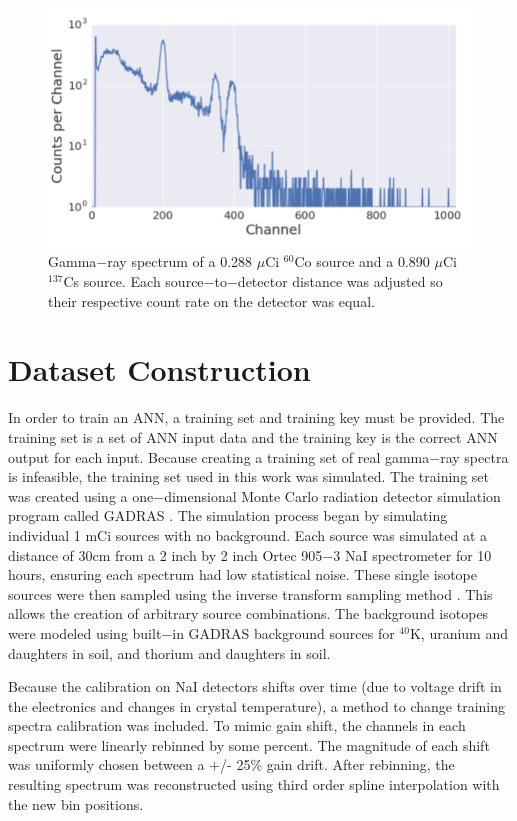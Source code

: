 \documentclass[tocnosub,noragright,centerchapter,12pt,fullpage]{uiucecethesis09}
\begin{document}
\begin{figure}[H]
    \centering
    \includegraphics[width=0.7\linewidth]{images/CoCs_mix}
    \caption{Gamma$-$ray spectrum of a 0.288 $\mu$Ci $^{60}$Co source and a 0.890 $\mu$Ci $^{137}$Cs source. Each source$-$to$-$detector distance was adjusted so their respective count rate on the detector was equal.}
    \label{fig:top_five}
\end{figure}


\section{Dataset Construction}

In order to train an ANN, a training set and training key must be provided. The training set is a set of ANN input data and the training key is the correct ANN output for each input. Because creating a training set of real gamma$-$ray spectra is infeasible, the training set used in this work was simulated. The training set was created using a one$-$dimensional Monte Carlo radiation detector simulation program called GADRAS \cite{mitchell2014}. The simulation process began by simulating individual 1 mCi sources with no background. Each source was simulated at a distance of 30cm from a 2 inch by 2 inch Ortec 905$-$3 NaI spectrometer for 10 hours, ensuring each spectrum had low statistical noise. These single isotope sources were then sampled using the inverse transform sampling method \cite{Devroyne}. This allows the creation of arbitrary source combinations. The background isotopes were modeled using built$-$in GADRAS background sources for $^{40}$K, uranium and daughters in soil, and thorium and daughters in soil.

Because the calibration on NaI detectors shifts over time (due to voltage drift in the electronics and changes in crystal temperature), a method to change training spectra calibration was included. To mimic gain shift, the channels in each spectrum were linearly rebinned by some percent. The magnitude of each shift was uniformly chosen between a +/- 25\% gain drift. After rebinning, the resulting spectrum was reconstructed using third order spline interpolation with the new bin positions.
\end{document}
